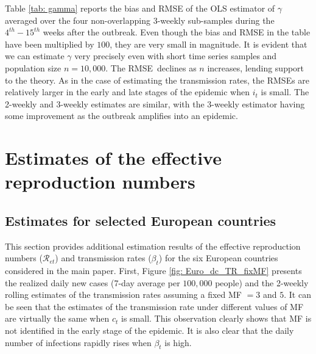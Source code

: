 \documentclass[12pt]{article}
\begin{document}
Table \ref{tab: gamma} reports the bias and RMSE of the OLS estimator of
$\gamma$ averaged over the four non-overlapping $3$-weekly sub-samples during
the $4^{th}-15^{th}$ weeks after the outbreak. Even though the bias and RMSE
in the table have been multiplied by $100$, they are very small in magnitude.
It is evident that we can estimate $\gamma$ very precisely even with short
time series samples and population size $n=10,000$. The RMSE\ declines as $n$
increases, lending support to the theory. As in the case of estimating the
transmission rates, the RMSEs are relatively larger in the early and late
stages of the epidemic when $i_{t}$ is small. The 2-weekly and 3-weekly
estimates are similar, with the 3-weekly estimator having some improvement as
the outbreak amplifies into an epidemic.

\section{Estimates of the effective reproduction numbers
\label{Sup: empirical_Re}}

\subsection{Estimates for selected European
countries\label{Sup: empirical_Re_Euro}}

This section provides additional estimation results of the effective
reproduction numbers ($\mathcal{R}_{et}$) and transmission rates ($\beta_{t}$)
for the six European countries considered in the main paper. First, Figure
\ref{fig: Euro_dc_TR_fixMF} presents the realized daily new cases (7-day
average per $100,000$ people) and the 2-weekly rolling estimates of the
transmission rates assuming a fixed MF $=3$ and $5$. It can be seen that the
estimates of the transmission rate under different values of MF are virtually
the same when $c_{t}$ is small. This observation clearly shows that MF is not
identified in the early stage of the epidemic. It is also clear that the daily
number of infections rapidly rises when $\beta_{t}$ is high.%
\end{document}
